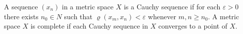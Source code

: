 A sequence $(x_n)$ in a metric space $X$ is a Cauchy sequence if for each $\varepsilon > 0$ there exists $n_0 \in N$ such that $\varrho(x_m, x_n) < \varepsilon$ whenever $m, n \geq n_0$. A metric space $X$ is complete if each Cauchy sequence in $X$ converges to a point of $X$.